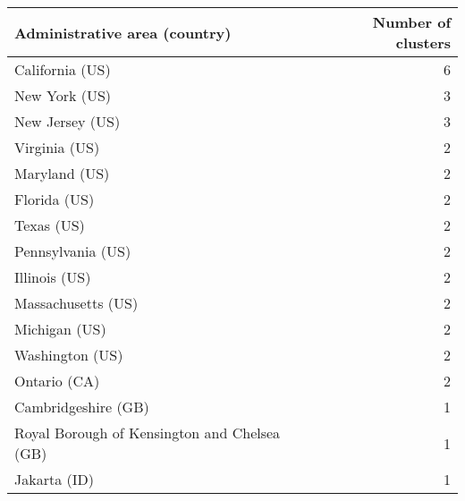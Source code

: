 \begin{tabular}{lr}
\toprule
                Administrative area (country) &  Number of clusters \\
\midrule
                              California (US) &                   6 \\
                                New York (US) &                   3 \\
                              New Jersey (US) &                   3 \\
                                Virginia (US) &                   2 \\
                                Maryland (US) &                   2 \\
                                 Florida (US) &                   2 \\
                                   Texas (US) &                   2 \\
                            Pennsylvania (US) &                   2 \\
                                Illinois (US) &                   2 \\
                           Massachusetts (US) &                   2 \\
                                Michigan (US) &                   2 \\
                              Washington (US) &                   2 \\
                                 Ontario (CA) &                   2 \\
                          Cambridgeshire (GB) &                   1 \\
 Royal Borough of Kensington and Chelsea (GB) &                   1 \\
                                 Jakarta (ID) &                   1 \\
\bottomrule
\end{tabular}
